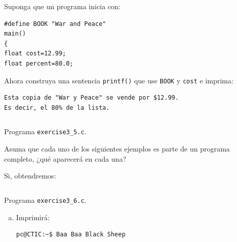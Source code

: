 \documentclass[spanish,addpoints,answers,a4paper]{exam}
\begin{document}
\begin{questions}
\question Suponga que un programa inicia con:

\begin{verbatim}
#define BOOK "War and Peace"
main()
{
float cost=12.99;
float percent=80.0;
\end{verbatim}

Ahora construya una sentencia \texttt{printf()} que use \texttt{BOOK} y \texttt{cost} e imprima:

\begin{verbatim}
Esta copia de "War y Peace" se vende por $12.99.
Es decir, el 80% de la lista.
\end{verbatim}

\begin{solution}
\begin{listing}[H]
	\footnotesize
	\inputminted{c}{exercise3_5.c}
	\caption{Programa \texttt{exercise3\_5.c}.}
	\label{lst:3.5}
\end{listing}
\end{solution}

\question Asuma que cada uno de los siguientes ejemplos es parte de un programa completo, ¿qué aparecerá en cada una?


\begin{solution}
Si, obtendremos:
\begin{listing}[H]
	\footnotesize
	\inputminted{c}{exercise3_6.c}
	\caption{Programa \texttt{exercise3\_6.c}.}
	\label{lst:3.6}
\end{listing}


\begin{multicols}{2}
\begin{enumerate}[(a)]

\item Imprimirá:

\begin{verbatim}
pc@CTIC:~$ Baa Baa Black Sheep
\end{verbatim}


\end{enumerate}
\end{multicols}
\end{solution}
\end{questions}
\end{document}
